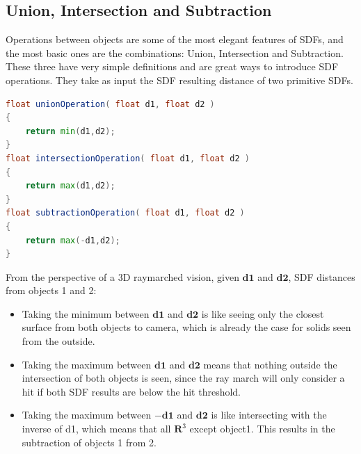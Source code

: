 \subsection{Union, Intersection and Subtraction}

Operations between objects are some of the most elegant features of SDFs, and the most basic ones are the combinations: Union, Intersection and Subtraction. These three have very simple definitions and are great ways to introduce SDF operations. They take as input the SDF resulting distance of two primitive SDFs.


\begin{lstlisting}[language=GLSL, caption={Code 5: SDF Union, Intersection and Subtraction}, label={lst:UnionIntersectionSubtraction} float=H]
float unionOperation( float d1, float d2 )
{
    return min(d1,d2);
}
float intersectionOperation( float d1, float d2 )
{
    return max(d1,d2);
}
float subtractionOperation( float d1, float d2 )
{
    return max(-d1,d2);
}
\end{lstlisting}

From the perspective of a 3D raymarched vision, given $\mathbf{d1}$ and $\mathbf{d2}$, SDF distances from objects 1 and 2:

\begin{itemize}
    \item Taking the minimum between $\mathbf{d1}$ and $\mathbf{d2}$ is like seeing only the closest surface from both objects to camera, which is already the case for solids seen from the outside.
    \item Taking the maximum between $\mathbf{d1}$ and $\mathbf{d2}$ means that nothing outside the intersection of both objects is seen, since the ray march will only consider a hit if both SDF results are below the hit threshold.
    \item Taking the maximum between $\mathbf{-d1}$ and $\mathbf{d2}$ is like intersecting with the inverse of d1, which means that all $\mathbf{R}^3 $ except object1. This results in the subtraction of objects 1 from 2.
\end{itemize}



